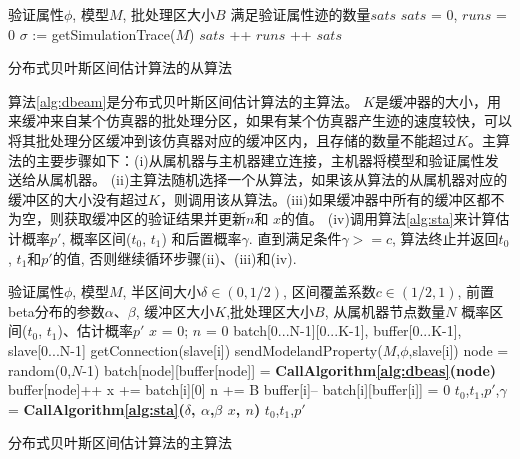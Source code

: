 \begin{algorithm}[t]
\begin{algorithmic}[1]
\REQUIRE 验证属性$\phi$, 模型$M$, 批处理区大小$B$
\ENSURE 满足验证属性迹的数量$sats$
\STATE $sats$ = 0, $runs$ = 0
\LOOP
        \STATE $\sigma$ := getSimulationTrace($M$)
        \IF{$\sigma \models \phi$}
        \STATE $sats$ ++
        \ENDIF
        \STATE $runs$ ++ 
        \RETURN $sats$
        \ENDIF
\ENDLOOP
\end{algorithmic}
\caption{分布式贝叶斯区间估计算法的从算法}
\label{alg:dbeas}
\end{algorithm}
算法\ref{alg:dbeam}是分布式贝叶斯区间估计算法的主算法。 \emph{$K$}是缓冲器的大小，用来缓冲来自某个仿真器的批处理分区，如果有某个仿真器产生迹的速度较快，可以将其批处理分区缓冲到该仿真器对应的缓冲区内，且存储的数量不能超过\emph{$K$}。主算法的主要步骤如下：(i)从属机器与主机器建立连接，主机器将模型和验证属性发送给从属机器。 (ii)主算法随机选择一个从算法，如果该从算法的从属机器对应的缓冲区的大小没有超过\emph{$K$}，则调用该从算法。(iii)如果缓冲器中所有的缓冲区都不为空，则获取缓冲区的验证结果并更新\emph{$n$}和 \emph{$x$}的值。 (iv)调用算法\ref{alg:sta}来计算估计概率$p'$, 概率区间($t_0$, $t_1$) 和后置概率$\gamma$. 直到满足条件$\gamma >= c$, 算法终止并返回$t_0$, $t_1$和$p'$的值, 否则继续循环步骤(ii)、(iii)和(iv).

\begin{algorithm}[t]
\begin{algorithmic}[1]
\REQUIRE 验证属性$\phi$, 模型$M$, 半区间大小$\delta \in (0, 1/2)$, 区间覆盖系数$c \in (1/2, 1)$, 前置beta分布的参数$\alpha$、$\beta$, 缓冲区大小$K$,批处理区大小$B$, 从属机器节点数量$N$
\ENSURE 概率区间($t_0$, $t_1$)、估计概率$p'$
\STATE $x$ = 0; $n$ = 0
\STATE batch[0...N-1][0...K-1], buffer[0...K-1], slave[0...N-1]
\LOOP 
\STATE getConnection(slave[i])
\STATE sendModelandProperty($M$,$\phi$,slave[i])
\RETURN
\ENDIF
\ENDLOOP
\LOOP
        \STATE node = random(0,$N$-1)
         \STATE batch[node][buffer[node]] = \textbf{CallAlgorithm\ref{alg:dbeas}(node)}
         \STATE buffer[node]++
         \ENDIF
         \LOOP
             \STATE x += batch[i][0]
              \STATE n += B
             \STATE buffer[i]--
             \STATE batch[i][buffer[i]] = 0
         \RETURN
         \ENDIF
         \ENDLOOP
         \ENDIF
         \STATE $t_0$,$t_1$,$p'$,$\gamma$ = \textbf{CallAlgorithm\ref{alg:sta}($\delta$, $\alpha$,$\beta$ $x$, $n$)}
         \RETURN $t_0$,$t_1$,$p'$
         \ENDIF
\ENDLOOP
\end{algorithmic}
\caption{分布式贝叶斯区间估计算法的主算法}
\label{alg:dbeam}
\end{algorithm}
